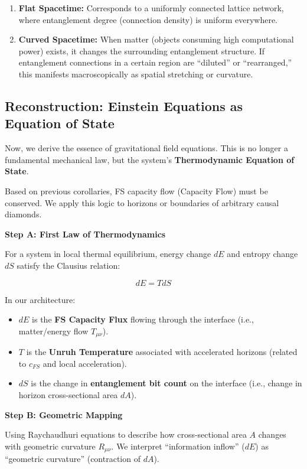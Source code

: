 \documentclass[11pt,a4paper,twoside]{book}
\begin{document}
\begin{enumerate}
\item \textbf{Flat Spacetime:} Corresponds to a uniformly connected lattice network, where entanglement degree (connection density) is uniform everywhere.

\item \textbf{Curved Spacetime:} When matter (objects consuming high computational power) exists, it changes the surrounding entanglement structure. If entanglement connections in a certain region are ``diluted'' or ``rearranged,'' this manifests macroscopically as spatial stretching or curvature.
\end{enumerate}

\subsection{Reconstruction: Einstein Equations as Equation of State}

Now, we derive the essence of gravitational field equations. This is no longer a fundamental mechanical law, but the system's \textbf{Thermodynamic Equation of State}.

Based on previous corollaries, FS capacity flow (Capacity Flow) must be conserved. We apply this logic to horizons or boundaries of arbitrary causal diamonds.

\textbf{Step A: First Law of Thermodynamics}

For a system in local thermal equilibrium, energy change $dE$ and entropy change $dS$ satisfy the Clausius relation:

$$dE = T dS$$

In our architecture:

\begin{itemize}
\item $dE$ is the \textbf{FS Capacity Flux} flowing through the interface (i.e., matter/energy flow $T_{\mu\nu}$).

\item $T$ is the \textbf{Unruh Temperature} associated with accelerated horizons (related to $c_{FS}$ and local acceleration).

\item $dS$ is the change in \textbf{entanglement bit count} on the interface (i.e., change in horizon cross-sectional area $dA$).
\end{itemize}

\textbf{Step B: Geometric Mapping}

Using Raychaudhuri equations to describe how cross-sectional area $A$ changes with geometric curvature $R_{\mu\nu}$. We interpret ``information inflow'' ($dE$) as ``geometric curvature'' (contraction of $dA$).
\end{document}
